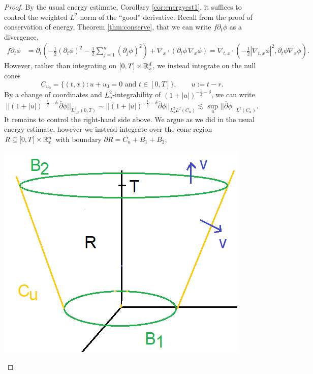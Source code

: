 \begin{proof}
	By the usual energy estimate, Corollary \ref{cor:energyest1}, it suffices to control the weighted $L^2$-norm of the ``good'' derivative. Recall from the proof of conservation of energy, Theorem \ref{thm:conserve}, that we can write $f \partial_t \phi$ as a divergence, 
				\begin{align*}
		f \partial_t \phi 
			&= \partial_t \left( -\frac12 (\partial_t \phi)^2 - \frac12 \sum_{j = 1}^n (\partial_j \phi)^2 \right) + \nabla_x \cdot (\partial_t \phi \, \nabla_x \phi) = \nabla_{t, x} \cdot \left( -\frac12 |\nabla_{t, x} \phi|^2, \partial_t \phi \nabla_x \phi \right).
	\end{align*}
	However, rather than integrating on $[0, T] \times \mathbb R^d_x$, we instead integrate on the null cones 
		\[C_{u_0} = \{ (t, x) :  u + u_0 = 0 \text{ and } t \in [0, T] \}, \qquad u := t - r. \]
	By a change of coordinates and $L^2_u$-integrability of $(1 + |u|)^{-\frac12 - \delta}$, we can write
		\[ ||(1 + |u|)^{-\frac12 - \delta}\, \overline\partial \phi||_{L^2_{t, x} (0, T)} \sim || (1 + |u|)^{-\frac12 - \delta}  \overline\partial \phi||_{L^2_u L^2 (C_u)} \lesssim \sup_{u} ||\overline \partial \phi ||_{L^2 (C_u)}.\]	
	It remains to control the right-hand side above. We argue as we did in the usual energy estimate, however we instead integrate over the cone region $R \subseteq [0, T] \times \mathbb R^n_x$ with boundary $\partial R = C_u + B_1 + B_2$,
	\begin{center}
		\includegraphics[scale = 0.5]{graphics/divergence}
	\end{center}

\end{proof}
